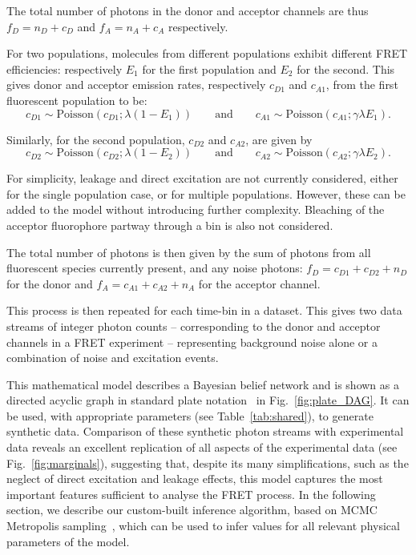 The total number of photons in the donor and acceptor channels are thus $f_D = n_D + c_D$ and $f_A = n_A + c_A$ respectively.   

For two populations, molecules from different populations exhibit different FRET efficiencies: respectively $E_1$ for the first population and $E_2$ for the second. This gives donor and acceptor emission rates, respectively $c_{D1}$ and $c_{A1}$, from the first fluorescent population to be:
\begin{equation}
 c_{D1} \sim \text{Poisson}(c_{D1}; \lambda(1-E_1)) \qquad \text{and} \qquad c_{A1} \sim \text{Poisson}(c_{A1}; \gamma \lambda E_1). 
\end{equation}

Similarly, for the second population, $c_{D2}$ and $c_{A2}$, are given by
\begin{equation}
 c_{D2} \sim \text{Poisson}(c_{D2}; \lambda(1-E_2)) \qquad \text{and} \qquad c_{A2} \sim \text{Poisson}(c_{A2}; \gamma \lambda E_2). 
\end{equation}

For simplicity, leakage and direct excitation are not currently considered, either for the single population case, or for multiple populations. However, these can be added to the model without introducing further complexity. Bleaching of the acceptor fluorophore partway through a bin is also not considered. 

The total number of photons is then given by the sum of photons from all fluorescent species currently present, and any noise photons: $f_D = c_{D1}+c_{D2}+n_D$ for the donor and $f_A = c_{A1}+c_{A2} +n_A$ for the acceptor channel.     

This process is then repeated for each time-bin in a dataset. This gives two data streams of integer photon counts -- corresponding to the donor and acceptor channels in a FRET experiment -- representing background noise alone or a combination of noise and excitation events.

This mathematical model describes a Bayesian belief network and is shown as a directed acyclic graph in standard plate notation~\cite{Buntine1994} in Fig.~\ref{fig:plate_DAG}. It can be used, with appropriate parameters (see Table~\ref{tab:shared}), to generate synthetic data. Comparison of these synthetic photon streams with experimental data reveals an excellent replication of all aspects of the experimental data (see Fig.~\ref{fig:marginals}), suggesting that, despite its many simplifications, such as the neglect of direct excitation and leakage effects, this model captures the most important features sufficient to analyse the FRET process. In the following section, we describe our custom-built inference algorithm, based on MCMC Metropolis sampling~\cite{hastings70}, which can be used to infer values for all relevant physical parameters of the model.

